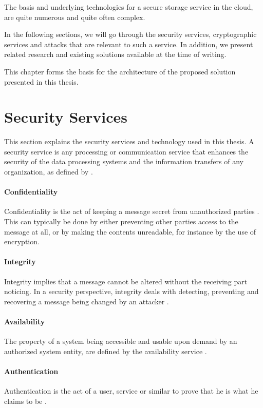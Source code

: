 \documentclass[pdftex,english,10pt,b5paper,twoside]{book}
\begin{document}
The basis and underlying technologies for a secure storage service in the
cloud, are quite numerous and quite often complex.

In the following sections, we will go through the security services, cryptographic
services and attacks that are relevant to such a service. In addition, we present
related research and existing solutions available at the time of writing.

This chapter forms the basis for the architecture of the proposed solution
presented in this thesis.

\section{Security Services}

This section explains the security services and technology used in this thesis. A security
service is any processing or communication service that enhances the security of
the data processing systems and the information transfers of any organization,
as defined by \citet[p. 12]{stallings}.

\paragraph{Confidentiality} Confidentiality is the act of keeping a message
secret from unauthorized parties \cite[p. 18]{stallings}. This can typically be
done by either preventing other parties access to the message at all, or by making
the contents unreadable, for instance by the use of encryption.

\paragraph{Integrity} Integrity implies that a message cannot be altered
without the receiving part noticing. In a security perspective, integrity deals
with detecting, preventing and recovering a message being changed by an
attacker \cite{stallings}.

\paragraph{Availability} The property of a system being accessible and usable
upon demand by an authorized system entity, are defined by the availability
service \cite{stallings}. 

\paragraph{Authentication} Authentication is the act of a user, service or
similar to prove that he is what he claims to be \cite{stallings}.
\end{document}
